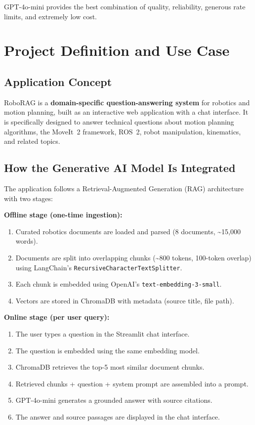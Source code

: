 \documentclass[12pt, a4paper]{article}
\begin{document}
GPT-4o-mini provides the best combination of quality, reliability, generous rate limits, and extremely low cost.


\section{Project Definition and Use Case}

\subsection{Application Concept}

RoboRAG is a \textbf{domain-specific question-answering system} for robotics and motion planning, built as an interactive web application with a chat interface. It is specifically designed to answer technical questions about motion planning algorithms, the MoveIt~2 framework, ROS~2, robot manipulation, kinematics, and related topics.

\subsection{How the Generative AI Model Is Integrated}

The application follows a Retrieval-Augmented Generation (RAG) architecture with two stages:

\textbf{Offline stage (one-time ingestion):}
\begin{enumerate}[nosep]
    \item Curated robotics documents are loaded and parsed (8 documents, \textasciitilde15,000 words).
    \item Documents are split into overlapping chunks (\textasciitilde800 tokens, 100-token overlap) using LangChain's \texttt{RecursiveCharacterTextSplitter}.
    \item Each chunk is embedded using OpenAI's \texttt{text-embedding-3-small}.
    \item Vectors are stored in ChromaDB with metadata (source title, file path).
\end{enumerate}

\textbf{Online stage (per user query):}
\begin{enumerate}[nosep]
    \item The user types a question in the Streamlit chat interface.
    \item The question is embedded using the same embedding model.
    \item ChromaDB retrieves the top-5 most similar document chunks.
    \item Retrieved chunks + question + system prompt are assembled into a prompt.
    \item GPT-4o-mini generates a grounded answer with source citations.
    \item The answer and source passages are displayed in the chat interface.
\end{enumerate}
\end{document}
